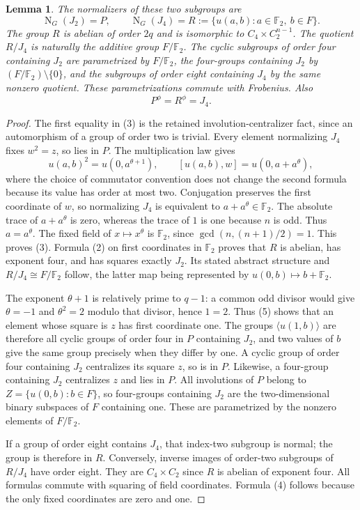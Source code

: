 \documentclass[11pt,a4paper]{article}
\newtheorem{lemma}[theorem]{Lemma}
\newcommand{\F}{\mathbb F}
\newcommand{\gen}[1]{\langle #1\rangle}
\newcommand{\N}{\operatorname{N}}
\begin{document}
\begin{lemma}\label{root}
The normalizers of these two subgroups are
\[
 \N_G(J_2)=P,\qquad
 \N_G(J_4)=R:=\{u(a,b):a\in\F_2,\ b\in F\}.
                                                        \tag{3}
\]
The group $R$ is abelian of order $2q$ and is isomorphic to
$C_4\times C_2^{n-1}$. The quotient $R/J_4$ is naturally the
additive group $F/\F_2$. The cyclic subgroups of order four
containing $J_2$ are parametrized by $F/\F_2$, the four-groups
containing $J_2$ by $(F/\F_2)\setminus\{0\}$, and the subgroups
of order eight containing $J_4$ by the same nonzero quotient.
These parametrizations commute with Frobenius. Also
\[
       P^\phi=R^\phi=J_4.
                                                        \tag{4}
\]
\end{lemma}
\begin{proof}
The first equality in (3) is the retained involution-centralizer
fact, since an automorphism of a group of order two is trivial.
Every element normalizing $J_4$ fixes $w^2=z$, so lies in $P$.
The multiplication law gives
\[
 u(a,b)^2=u(0,a^{\theta+1}),\qquad
 [u(a,b),w]=u(0,a+a^\theta),
                                                        \tag{5}
\]
where the choice of commutator convention does not change the
second formula because its value has order at most two.
Conjugation preserves the first coordinate of $w$, so normalizing
$J_4$ is equivalent to $a+a^\theta\in\F_2$.
The absolute trace of $a+a^\theta$ is zero, whereas the trace of
$1$ is one because $n$ is odd. Thus $a=a^\theta$. The fixed
field of $x\mapsto x^\theta$ is $\F_2$, since
$\gcd(n,(n+1)/2)=1$. This proves (3). Formula (2) on first
coordinates in $\F_2$ proves that $R$ is abelian, has exponent
four, and has squares exactly $J_2$. Its stated abstract structure
and $R/J_4\cong F/\F_2$ follow, the latter map being represented
by $u(0,b)\mapsto b+\F_2$.

The exponent $\theta+1$ is relatively prime to $q-1$: a common
odd divisor would give $\theta=-1$ and $\theta^2=2$ modulo that
divisor, hence $1=2$. Thus (5) shows that an element whose square
is $z$ has first coordinate one. The groups $\gen{u(1,b)}$ are
therefore all cyclic groups of order four in $P$ containing $J_2$, and
two values of $b$ give the same group precisely when they differ
by one. A cyclic group of order four containing $J_2$ centralizes
its square $z$, so is in $P$. Likewise, a four-group containing
$J_2$ centralizes $z$ and lies in $P$. All involutions of $P$
belong to $Z=\{u(0,b):b\in F\}$, so
four-groups containing $J_2$ are the two-dimensional binary
subspaces of $F$ containing one. These are parametrized by the
nonzero elements of $F/\F_2$.

If a group of order eight contains $J_4$, that index-two subgroup
is normal; the group is therefore in $R$. Conversely, inverse
images of order-two subgroups of $R/J_4$ have order eight.
They are $C_4\times C_2$ since $R$ is abelian of exponent four.
All formulas commute with squaring of field coordinates. Formula
(4) follows because the only fixed coordinates are zero and one.
\end{proof}
\end{document}
